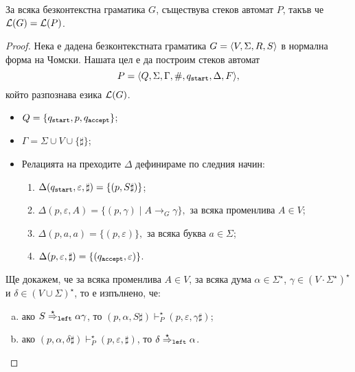 \begin{important}
  \begin{lemma}
    За всяка безконтекстна граматика $G$,
    съществува стеков автомат $P$, такъв че $\mathcal{L}(G) = \mathcal{L}(P)$.
  \end{lemma}
\end{important}
\begin{proof}
  Нека е дадена безконтекстната граматика $G = \langle{V,\Sigma,R,S}\rangle$ в нормална форма на Чомски.
  Нашата цел е да построим стеков автомат
  \[P = \langle{Q,\Sigma,\Gamma,\#,q_{\texttt{start}},\Delta,F}\rangle,\] който разпознава езика $\mathcal{L}(G)$.
  \begin{itemize}
  \item
    $Q = \{q_{\texttt{start}},p,q_{\texttt{accept}}\}$;
  \item
    $\Gamma = \Sigma \cup V \cup \{\sharp\}$;
  \item
    Релацията на преходите $\Delta$ дефинираме по следния начин:
    \begin{enumerate}[(1)]
    \item 
      $\Delta(q_{\texttt{start}}, \varepsilon, \sharp ) = \{(p,S\sharp)\}$;
    \item
      $\Delta(p,\varepsilon,A) = \{(p,\gamma)\mid A\to_G \gamma\}, \text{ за всяка променлива }A \in V$;
    \item
      $\Delta(p,a,a) = \{(p,\varepsilon)\}, \text{ за всяка буква } a \in \Sigma$;
    \item
      $\Delta(p,\varepsilon,\sharp) = \{(q_{\texttt{accept}}, \varepsilon)\}$.
    \end{enumerate}
  \end{itemize}

  Ще докажем, че за всяка променлива $A \in V$, за всяка дума $\alpha \in \Sigma^\star$, $\gamma \in (V \cdot \Sigma^\star)^\star$ и $\delta \in (V \cup \Sigma)^\star$, то е изпълнено, че:
  \begin{enumerate}[(a)]
  \item
    ако $S \stackrel{{\star}}{\Rightarrow}_{\texttt{left}} \alpha \gamma$, то $(p, \alpha, S\sharp) \vdash^\star_P (p, \varepsilon, \gamma\sharp)$;
  \item
    ако $(p, \alpha, \delta\sharp) \vdash^\star_P (p, \varepsilon, \sharp)$, то $\delta \stackrel{{\star}}{\Rightarrow}_{\texttt{left}} \alpha$.
  \end{enumerate}


\end{proof}
